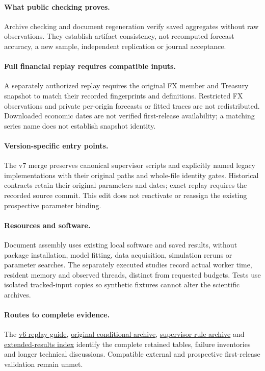 \documentclass[11pt,a4paper]{article}
\begin{document}
\paragraph{What public checking proves.}
Archive checking and document regeneration verify saved aggregates without raw
observations. They establish artifact consistency, not recomputed forecast
accuracy, a new sample, independent replication or journal acceptance.

\paragraph{Full financial replay requires compatible inputs.}
A separately authorized replay requires the original FX member and Treasury
snapshot to match their recorded fingerprints and definitions. Restricted FX
observations and private per-origin forecasts or fitted traces are not
redistributed. Downloaded economic dates are not verified first-release
availability; a matching series name does not establish snapshot identity.

\paragraph{Version-specific entry points.}
The v7 merge preserves canonical supervisor scripts and explicitly named legacy
implementations with their original paths and whole-file identity gates.
Historical contracts retain their original parameters and dates; exact replay
requires the recorded source commit. This edit does not reactivate or reassign
the existing prospective parameter binding.

\paragraph{Resources and software.}
Document assembly uses existing local software and saved results, without
package installation, model fitting, data acquisition, simulation reruns or
parameter searches. The separately executed studies record actual worker time,
resident memory and observed threads, distinct from requested budgets. Tests
use isolated tracked-input copies so synthetic fixtures cannot alter the
scientific archives.

\paragraph{Routes to complete evidence.}
The \href{https://github.com/ByronLi0207/financial-mathematics-paper-20261020/blob/revision-v7-final/protocol/revision-v6/REPLAY.md}{v6 replay guide},
\href{https://github.com/ByronLi0207/financial-mathematics-paper-20261020/blob/revision-v7-final/results/revision-20261022/README.md}{original conditional archive},
\href{https://github.com/ByronLi0207/financial-mathematics-paper-20261020/blob/revision-v7-final/results/supervisor-20261023/r6/README.md}{supervisor rule archive} and
\href{https://github.com/ByronLi0207/financial-mathematics-paper-20261020/blob/revision-v7-final/EXTENDED_RESULTS.md}{extended-results index} identify the
complete retained tables, failure inventories and longer technical discussions.
Compatible external and prospective first-release validation remain unmet.
\end{document}
